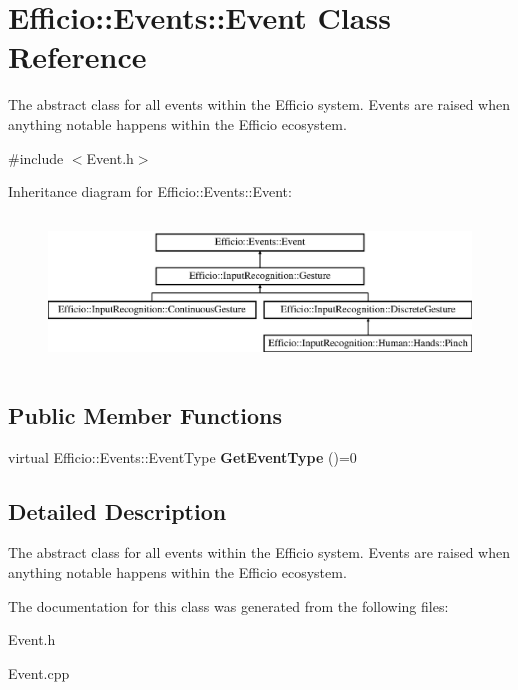 \hypertarget{class_efficio_1_1_events_1_1_event}{}\section{Efficio\+:\+:Events\+:\+:Event Class Reference}
\label{class_efficio_1_1_events_1_1_event}


The abstract class for all events within the Efficio system. Events are raised when anything notable happens within the Efficio ecosystem.  




{\ttfamily \#include $<$Event.\+h$>$}

Inheritance diagram for Efficio\+:\+:Events\+:\+:Event\+:\begin{figure}[H]
\begin{center}
\leavevmode
\includegraphics[height=4.000000cm]{class_efficio_1_1_events_1_1_event}
\end{center}
\end{figure}
\subsection*{Public Member Functions}
\begin{DoxyCompactItemize}
\item 
virtual Efficio\+::\+Events\+::\+Event\+Type {\bfseries Get\+Event\+Type} ()=0\hypertarget{class_efficio_1_1_events_1_1_event_a5758bd5812bfd09e0127892c490d553b}{}\label{class_efficio_1_1_events_1_1_event_a5758bd5812bfd09e0127892c490d553b}

\end{DoxyCompactItemize}


\subsection{Detailed Description}
The abstract class for all events within the Efficio system. Events are raised when anything notable happens within the Efficio ecosystem. 

The documentation for this class was generated from the following files\+:\begin{DoxyCompactItemize}
\item 
Event.\+h\item 
Event.\+cpp\end{DoxyCompactItemize}
